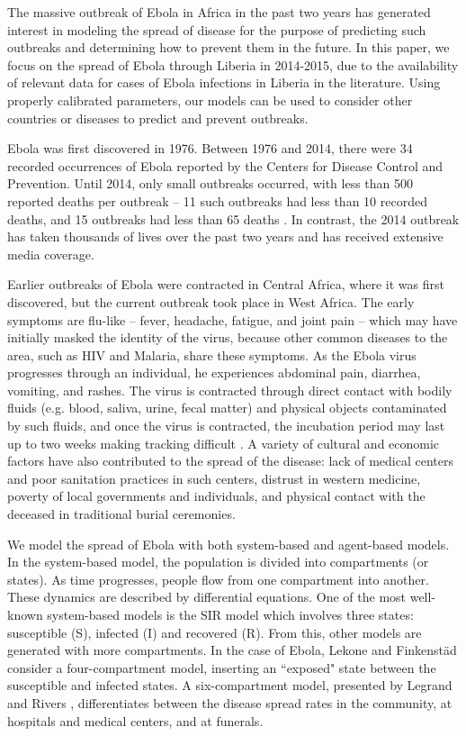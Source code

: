 The massive outbreak of Ebola in Africa in the past two years has generated interest in modeling the spread of disease for the purpose of predicting such outbreaks and determining how to prevent them in the future. In this paper, we focus on the spread of Ebola through Liberia in 2014-2015, due to the availability of relevant data for cases of Ebola infections in Liberia in the literature. Using properly calibrated parameters, our models can be used to consider other countries or diseases to predict and prevent outbreaks.

Ebola was first discovered in 1976. Between 1976 and 2014, there were 34 recorded occurrences of Ebola reported by the Centers for Disease Control and Prevention. Until 2014, only small outbreaks occurred, with less than 500 reported deaths per outbreak -- 11 such outbreaks had less than 10 recorded deaths, and 15 outbreaks had less than 65 deaths \cite{CDCOutbreaks}. In contrast, the 2014 outbreak has taken thousands of lives over the past two years and has received extensive media coverage.

Earlier outbreaks of Ebola were contracted in Central Africa, where it was first discovered, but the current outbreak took place in West Africa. The early symptoms are flu-like -- fever, headache, fatigue, and joint pain -- which may have initially masked the identity of the virus, because other common diseases to the area, such as HIV and Malaria, share these symptoms. As the Ebola virus progresses through an individual, he experiences abdominal pain, diarrhea, vomiting, and rashes. The virus is contracted through direct contact with bodily fluids (e.g. blood, saliva, urine, fecal matter) and physical objects contaminated by such fluids, and once the virus is contracted, the incubation period may last up to two weeks making tracking difficult \cite{CDCSympt}. A variety of cultural and economic factors have also contributed to the spread of the disease: lack of medical centers and poor sanitation practices in such centers, distrust in western medicine, poverty of local governments and individuals, and physical contact with the deceased in traditional burial ceremonies\cite{WHOReasons}.

We model the spread of Ebola with both system-based and agent-based models. In the system-based model, the population is divided into compartments (or states). As time progresses, people flow from one compartment into another. These dynamics are described by differential equations. One of the most well-known system-based models is the SIR model which involves three states: susceptible (S), infected (I) and recovered (R). From this, other models are generated with more compartments. In the case of Ebola, Lekone and Finkenstäd \cite{Lekone2006} consider a four-compartment model, inserting an ``exposed" state between the susceptible and infected states. A six-compartment model, presented by Legrand \cite{Legrand2007} and Rivers \cite{Rivers2014}, differentiates between the disease spread rates in the community, at hospitals and medical centers, and at funerals.

